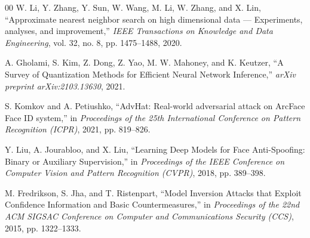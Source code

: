 \documentclass[conference]{IEEEtran}
\begin{document}
\begin{thebibliography}{00}
 W. Li, Y. Zhang, Y. Sun, W. Wang, M. Li, W. Zhang, and X. Lin, ``Approximate nearest neighbor search on high dimensional data — Experiments, analyses, and improvement,'' \textit{IEEE Transactions on Knowledge and Data Engineering}, vol. 32, no. 8, pp. 1475--1488, 2020.

 A. Gholami, S. Kim, Z. Dong, Z. Yao, M. W. Mahoney, and K. Keutzer, ``A Survey of Quantization Methods for Efficient Neural Network Inference,'' \textit{arXiv preprint arXiv:2103.13630}, 2021.

 S. Komkov and A. Petiushko, ``AdvHat: Real-world adversarial attack on ArcFace Face ID system,'' in \textit{Proceedings of the 25th International Conference on Pattern Recognition (ICPR)}, 2021, pp. 819--826.

 Y. Liu, A. Jourabloo, and X. Liu, ``Learning Deep Models for Face Anti-Spoofing: Binary or Auxiliary Supervision,'' in \textit{Proceedings of the IEEE Conference on Computer Vision and Pattern Recognition (CVPR)}, 2018, pp. 389--398.

 M. Fredrikson, S. Jha, and T. Ristenpart, ``Model Inversion Attacks that Exploit Confidence Information and Basic Countermeasures,'' in \textit{Proceedings of the 22nd ACM SIGSAC Conference on Computer and Communications Security (CCS)}, 2015, pp. 1322--1333.

\end{thebibliography}
\end{document}
